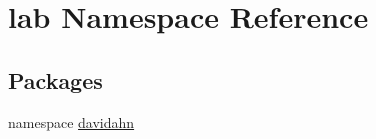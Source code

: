 \hypertarget{namespacelab}{\section{lab \-Namespace \-Reference}
\label{namespacelab}
}
\subsection*{\-Packages}
\begin{DoxyCompactItemize}
\item 
namespace \hyperlink{namespacelab_1_1davidahn}{davidahn}
\end{DoxyCompactItemize}
